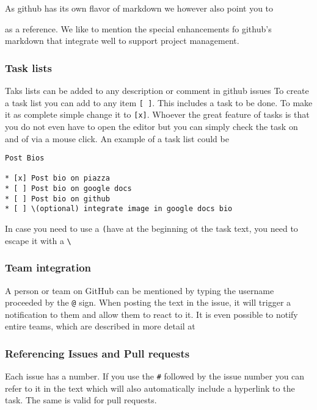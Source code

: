 As github has its own flavor of markdown we however also point you to 

as a reference. We like to mention the special enhancements fo github's
markdown that integrate well to
support project management.



\subsubsection{Task lists}

Taks lists can be added to any description or comment in github issues
To create a task list you can add to any item \verb|[ ]|. This includes a
task to be done. To make it as complete simple change it to
\verb|[x]|. Whoever the great feature of tasks is that you do not even have
to open the editor but you can simply check the task on and of via a
mouse click. An example of a task list could be 

\begin{lstlisting}
Post Bios

* [x] Post bio on piazza
* [ ] Post bio on google docs
* [ ] Post bio on github
* [ ] \(optional) integrate image in google docs bio
\end{lstlisting}

In case you need to use a \verb|(|have at the beginning ot the task
text, you need to escape it with a \verb|\|

\subsubsection{Team integration}

A person or team on GitHub can be mentioned by typing the username
proceeded by the \verb|@| sign. When posting the text in the issue, it
will trigger a notification to them and allow them to react to it. It
is even possible to notify entire teams, which are described in more
detail at 


\subsubsection{Referencing Issues and Pull requests}

Each issue has a number. If you use the \verb|#| followed by the issue
number you can refer to it in the text which will also automatically
include a hyperlink to the task. The same is valid for pull requests.

